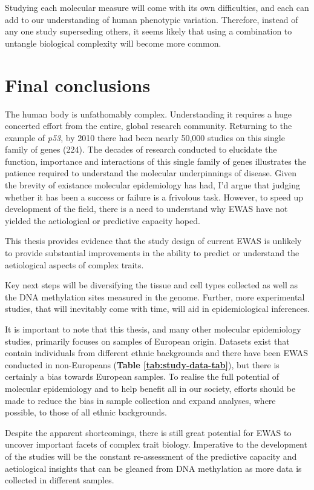 \documentclass[11pt,oneside]{bristolthesis}
\begin{document}
Studying each molecular measure will come with its own difficulties, and each can add to our understanding of human phenotypic variation. Therefore, instead of any one study superseding others, it seems likely that using a combination to untangle biological complexity will become more common.

\hypertarget{final-conclusions}{%
\section{Final conclusions}\label{final-conclusions}}

The human body is unfathomably complex. Understanding it requires a huge concerted effort from the entire, global research community. Returning to the example of \emph{p53}, by 2010 there had been nearly 50,000 studies on this single family of genes (224). The decades of research conducted to elucidate the function, importance and interactions of this single family of genes illustrates the patience required to understand the molecular underpinnings of disease. Given the brevity of existance molecular epidemiology has had, I'd argue that judging whether it has been a success or failure is a frivolous task. However, to speed up development of the field, there is a need to understand why EWAS have not yielded the aetiological or predictive capacity hoped.

This thesis provides evidence that the study design of current EWAS is unlikely to provide substantial improvements in the ability to predict or understand the aetiological aspects of complex traits.

Key next steps will be diversifying the tissue and cell types collected as well as the DNA methylation sites measured in the genome. Further, more experimental studies, that will inevitably come with time, will aid in epidemiological inferences.

It is important to note that this thesis, and many other molecular epidemiology studies, primarily focuses on samples of European origin. Datasets exist that contain individuals from different ethnic backgrounds and there have been EWAS conducted in non-Europeans (\textbf{Table \ref{tab:study-data-tab}}), but there is certainly a bias towards European samples. To realise the full potential of molecular epidemiology and to help benefit all in our society, efforts should be made to reduce the bias in sample collection and expand analyses, where possible, to those of all ethnic backgrounds.

Despite the apparent shortcomings, there is still great potential for EWAS to uncover important facets of complex trait biology. Imperative to the development of the studies will be the constant re-assessment of the predictive capacity and aetiological insights that can be gleaned from DNA methylation as more data is collected in different samples.
\end{document}
